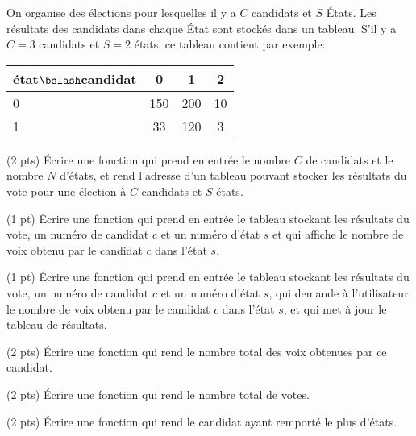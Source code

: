 

On organise des {\'e}lections pour lesquelles il y a $C$ candidats et $S$
{\'E}tats. Les r{\'e}sultats des candidats dans chaque {\'E}tat sont stock{\'e}s dans
un tableau. S'il y a $C=3$ candidats et $S=2$
{\'e}tats, ce tableau contient par exemple:
\begin{center}
  \begin{tabular}{|l|c|c|c|}
    \hline
    {\'e}tat$\bslash$candidat & 0 & 1 & 2 \\
    \hline
    0 & 150 & 200 & 10 \\
    \hline
    1 & 33 & 120 & 3 \\
    \hline
  \end{tabular}
\end{center}


\question (2 pts) {\'E}crire une fonction  qui prend en
  entr{\'e}e le nombre $C$ de candidats et le nombre $N$ d'{\'e}tats, et rend
  l'adresse d'un tableau pouvant stocker les
  r{\'e}sultats du vote pour une {\'e}lection {\`a} $C$ candidats et $S$ {\'e}tats.

\question (1 pt) {\'E}crire une fonction  qui prend
  en entr{\'e}e le tableau stockant les r{\'e}sultats du vote, un num{\'e}ro de
  candidat $c$ et un num{\'e}ro d'{\'e}tat $s$ et qui affiche le nombre de voix
  obtenu par le candidat $c$ dans l'{\'e}tat $s$.

\question (1 pt) {\'E}crire une fonction  qui prend en
  entr{\'e}e le tableau stockant les r{\'e}sultats du vote, un num{\'e}ro de
  candidat $c$ et un num{\'e}ro d'{\'e}tat $s$, qui demande {\`a} l'utilisateur le
  nombre de voix obtenu par le candidat $c$ dans l'{\'e}tat $s$, et qui
  met {\`a} jour le tableau de r{\'e}sultats.

\question (2 pts) {\'E}crire une fonction  qui rend le
  nombre total des voix obtenues par ce candidat.

\question (2 pts) {\'E}crire une fonction  qui rend le nombre
total de votes.


\question (2 pts) {\'E}crire une fonction  qui rend le candidat
  ayant remport{\'e} le plus d'{\'e}tats.

